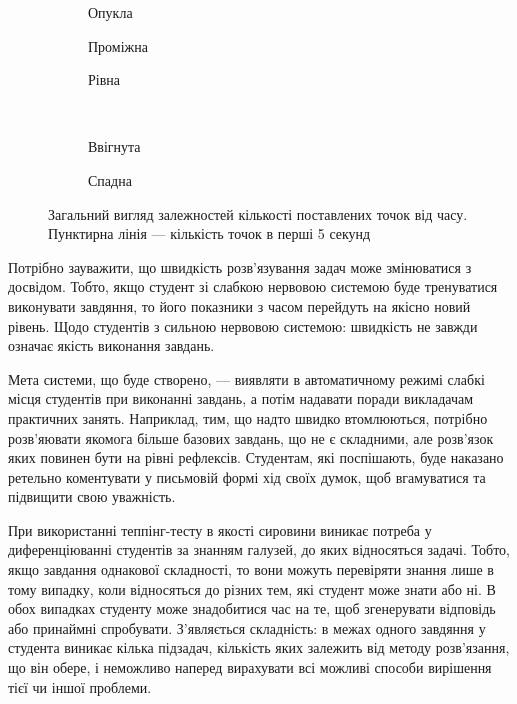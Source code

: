 \begin{figure}[h]
  \centering
  \begin{subfigure}[b]{0.3\textwidth}
                \caption{Опукла}
                \label{fig:tapping:movable}
  \end{subfigure}
  \begin{subfigure}[b]{0.3\textwidth}
                \caption{Проміжна}
                \label{fig:tapping:middle}
  \end{subfigure}
  \begin{subfigure}[b]{0.3\textwidth}
                \caption{Рівна}
                \label{fig:tapping:flat}
  \end{subfigure}\\[2ex]
  \begin{subfigure}[b]{0.3\textwidth}
                \caption{Ввігнута}
                \label{fig:tapping:concave}
  \end{subfigure}
  \begin{subfigure}[b]{0.3\textwidth}
                \caption{Спадна}
                \label{fig:tapping:weak}
  \end{subfigure}
  \caption{Загальний вигляд залежностей кількості поставлених точок від часу.
  Пунктирна лінія --- кількість точок в перші 5 секунд}
  \label{fig:studentBehaviorSimple}
\end{figure}

Потрібно зауважити, що швидкість розв’язування задач може змінюватися з
досвідом.
Тобто, якщо студент зі слабкою нервовою системою буде тренуватися виконувати
завдяння, то його показники з часом перейдуть на якісно новий рівень.
Щодо студентів з сильною нервовою системою: швидкість не завжди означає якість
виконання завдань.

Мета системи, що буде створено, --- виявляти в автоматичному режимі слабкі
місця студентів  при виконанні завдань, а потім надавати поради викладачам
практичних занять.
Наприклад, тим, що надто швидко втомлюються, потрібно розв’яювати якомога
більше базових завдань, що не є складними, але розв’язок яких повинен бути
на рівні рефлексів.
Студентам, які поспішають, буде наказано ретельно коментувати у письмовій
формі хід своїх думок, щоб вгамуватися та підвищити свою уважність.

При використанні теппінг-тесту в якості сировини виникає потреба у
диференціюванні студентів за знанням галузей, до яких відносяться задачі.
Тобто, якщо завдання однакової складності, то вони можуть перевіряти знання
лише в тому випадку, коли відносяться до різних тем, які студент може знати або
ні.
В обох випадках студенту може знадобитися час на те, щоб згенерувати відповідь
або принаймні спробувати.
З’являється складність: в межах одного завдяння у студента виникає кілька
підзадач, кількість яких залежить від методу розв’язання, що він обере,
і неможливо наперед вирахувати всі можливі способи вирішення тієї чи іншої
проблеми.

